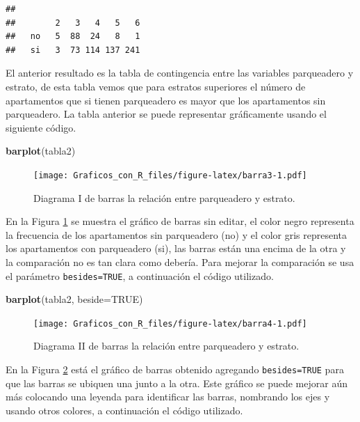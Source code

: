 \documentclass[10pt,]{krantz}
\makeatletter
\newenvironment{Shaded}{\begin{snugshade}}{\end{snugshade}}
\newcommand{\KeywordTok}[1]{\textcolor[rgb]{0.13,0.29,0.53}{\textbf{{#1}}}}
\newcommand{\DataTypeTok}[1]{\textcolor[rgb]{0.13,0.29,0.53}{{#1}}}
\newcommand{\OtherTok}[1]{\textcolor[rgb]{0.56,0.35,0.01}{{#1}}}
\newcommand{\NormalTok}[1]{{#1}}
\newenvironment{kframe}{%
\medskip{}
\setlength{\fboxsep}{.8em}
 \def\at@end@of@kframe{}%
 \ifinner\ifhmode%
  \def\at@end@of@kframe{\end{minipage}}%
  \begin{minipage}{\columnwidth}%
 \fi\fi%
 \def\FrameCommand##1{\hskip\@totalleftmargin \hskip-\fboxsep
 \colorbox{shadecolor}{##1}\hskip-\fboxsep
     \hskip-\linewidth \hskip-\@totalleftmargin \hskip\columnwidth}%
 \MakeFramed {\advance\hsize-\width
   \@totalleftmargin\z@ \linewidth\hsize
   \@setminipage}}%
 {\par\unskip\endMakeFramed%
 \at@end@of@kframe}
\renewenvironment{Shaded}{\begin{kframe}}{\end{kframe}}
\makeatother
\begin{document}
\begin{verbatim}
##     
##        2   3   4   5   6
##   no   5  88  24   8   1
##   si   3  73 114 137 241
\end{verbatim}

El anterior resultado es la tabla de contingencia entre las variables
parqueadero y estrato, de esta tabla vemos que para estratos superiores
el número de apartamentos que si tienen parqueadero es mayor que los
apartamentos sin parqueadero. La tabla anterior se puede representar
gráficamente usando el siguiente código.

\begin{Shaded}
\begin{Highlighting}[]
\KeywordTok{barplot}\NormalTok{(tabla2)}
\end{Highlighting}
\end{Shaded}

\begin{figure}[htbp]
\centering
\texttt{[image: Graficos\_con\_R\_files/figure-latex/barra3-1.pdf]}
\caption{\label{fig:barra3}Diagrama I de barras la relación entre
parqueadero y estrato.}
\end{figure}

En la Figura \ref{fig:barra3} se muestra el gráfico de barras sin
editar, el color negro representa la frecuencia de los apartamentos sin
parqueadero (no) y el color gris representa los apartamentos con
parqueadero (si), las barras están una encima de la otra y la
comparación no es tan clara como debería. Para mejorar la comparación se
usa el parámetro \texttt{besides=TRUE}, a continuación el código
utilizado.

\begin{Shaded}
\begin{Highlighting}[]
\KeywordTok{barplot}\NormalTok{(tabla2, }\DataTypeTok{beside=}\OtherTok{TRUE}\NormalTok{)}
\end{Highlighting}
\end{Shaded}

\begin{figure}[htbp]
\centering
\texttt{[image: Graficos\_con\_R\_files/figure-latex/barra4-1.pdf]}
\caption{\label{fig:barra4}Diagrama II de barras la relación entre
parqueadero y estrato.}
\end{figure}

En la Figura \ref{fig:barra4} está el gráfico de barras obtenido
agregando \texttt{besides=TRUE} para que las barras se ubiquen una junto
a la otra. Este gráfico se puede mejorar aún más colocando una leyenda
para identificar las barras, nombrando los ejes y usando otros colores,
a continuación el código utilizado.
\end{document}

